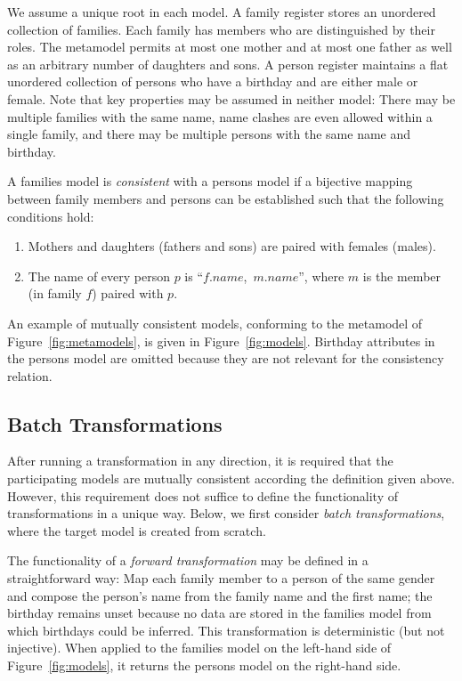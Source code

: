 We assume a unique root in each model. A family register stores an unordered collection of families. Each family has members who are distinguished by their roles. The metamodel permits at most one mother and at most one father as well as an arbitrary number of daughters and sons. A person register maintains a flat unordered collection of persons who have a birthday and are either male or female. Note that key properties may be assumed in neither model: There may be multiple families with the same name, name clashes are even allowed within a single family, and there may be multiple persons with the same name and birthday. 

A families model is \emph{consistent} with a persons model if a bijective mapping between family members and persons can be established such that the following conditions hold:

\begin{enumerate}
	\item  Mothers and daughters (fathers and sons) are paired with females (males).
	\item  The name of every person $p$ is ``$f.name$,~$m.name$'', where $m$ is the member (in family $f$) paired with $p$.
\end{enumerate}

An example of mutually consistent models, conforming to the metamodel of Figure~\ref{fig:metamodels}, is given in Figure~\ref{fig:models}. Birthday attributes in the persons model are omitted because they are not relevant for the consistency relation.



\subsection{Batch Transformations}
\label{sec:BatchTransformations}

After running a transformation in any direction, it is required that the participating models are mutually consistent according the definition given above. However, this requirement does not suffice to define the functionality of transformations in a unique way. Below, we first consider \emph{batch transformations}, where the target model is created from scratch.

The functionality of a \emph{forward transformation} may be defined in a straightforward way: Map each family member to a person of the same gender and compose the person's name from the family name and the first name; the birthday remains unset because no data are stored in the families model from which birthdays could be inferred. This transformation is deterministic (but not injective). When applied to the families model on the left-hand side of Figure~\ref{fig:models}, it returns the persons model on the right-hand side. 

